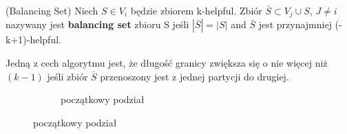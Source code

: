 \newpage

\begin{definition}
(Balancing Set)\newline
Niech $S \in V_i$ będzie zbiorem k-helpful. Zbiór $\bar{S} \subset V_j \cup S$, $J \neq i$ nazywany jest \textbf{balancing set}
zbioru S jeśli $|\bar{S}| = |S|$ and $\bar{S}$ jest przynajmniej (-k+1)-helpful.
\end{definition}

Jedną z cech algorytmu jest, że długość granicy zwiększa się o nie więcej niż $(k-1)$ jeśli zbiór $\bar{S}$ przenoszony jest
z jednej partycji do drugiej.


\newcommand\imgss{0.43}

\begin{figure}[h]
\begin{subfigure}{\textwidth}
    \centering
    \caption[short]{początkowy podział}
\end{subfigure}%


\end{figure}
